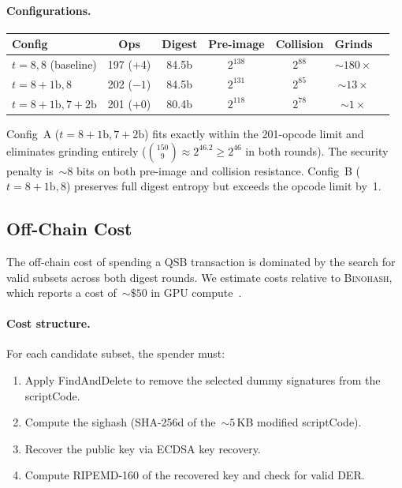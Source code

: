 \documentclass[11pt, a4paper]{article}
\begin{document}
\paragraph{Configurations.}

\begin{center}
\small
\begin{tabular}{lcccccc}
\toprule
\textbf{Config} & \textbf{Ops} & \textbf{Digest} & \textbf{Pre-image} & \textbf{Collision} & \textbf{Grinds} \\
\midrule
$t{=}8, 8$ (baseline) & 197 (+4) & 84.5b & $2^{138}$ & $2^{88}$ & ${\sim}180\times$ \\
$t{=}8{+}1\mathrm{b}, 8$ & 202 ($-1$) & 84.5b & $2^{131}$ & $2^{85}$ & ${\sim}13\times$ \\
$t{=}8{+}1\mathrm{b}, 7{+}2\mathrm{b}$ & 201 (+0) & 80.4b & $2^{118}$ & $2^{78}$ & ${\sim}1\times$ \\
\bottomrule
\end{tabular}
\end{center}

\noindent Config~A ($t = 8{+}1\mathrm{b}, 7{+}2\mathrm{b}$) fits exactly within the 201-opcode limit and eliminates grinding entirely ($\binom{150}{9} \approx 2^{46.2} \geq 2^{46}$ in both rounds). The security penalty is~${\sim}8$ bits on both pre-image and collision resistance. Config~B ($t = 8{+}1\mathrm{b}, 8$) preserves full digest entropy but exceeds the opcode limit by~1.

\subsection{Off-Chain Cost}
\label{sec:offchain-cost}

The off-chain cost of spending a QSB transaction is dominated by the search for valid subsets across both digest rounds. We estimate costs relative to \textsc{Binohash}, which reports a cost of~${\sim}\$50$ in GPU compute~\cite{linus2024binohash}.

\paragraph{Cost structure.}
For each candidate subset, the spender must:
\begin{enumerate}
    \item Apply FindAndDelete to remove the selected dummy signatures from the scriptCode.
    \item Compute the sighash (SHA-256d of the~${\sim}5$\,KB modified scriptCode).
    \item Recover the public key via ECDSA key recovery.
    \item Compute RIPEMD-160 of the recovered key and check for valid DER.
\end{enumerate}
\end{document}
